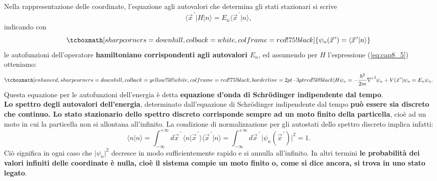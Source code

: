 Nella rappresentazione delle coordinate, l'equazione agli autovalori che determina gli stati stazionari si scrive
	\begin{equation}
		\langle {\vec{x}}^{\, \prime} \vert H \vert n \rangle = E_n\langle {\vec{x}}^{\, \prime} \vert n \rangle,
	\end{equation}
indicando con
	\begin{equation}
		\tcboxmath[sharp corners=downhill, colback=white, colframe=red!75!black]{
			\psi _n ({\vec{x}}^{\, \prime}) = \langle {\vec{x}}^{\, \prime} \vert n \rangle
			}
	\end{equation}
le autofunzioni dell'operatore \textbf{hamiltoniano corrispondenti agli autovalori $E_n$}, ed assumendo per $H$ l'espressione (\ref{eq:cap8_5}) otteniamo:
	\begin{equation}
		\tcboxmath[enhanced, sharp corners=downhill, colback=yellow!50!white, colframe=red!75!black, borderline={2pt}{-3pt}{red!50!black}]{
			H\psi _n = -\frac{\hbar ^ 2}{2m}{{\nabla '}^{\, 2}} \psi _n + V({\vec{x}}^{\, \prime})\psi _n = E_n \psi _n.
			}
	\end{equation}
Questa equazione per le autofunzioni dell'energia è detta \textbf{equazione d'onda di Schr\"{o}dinger indipendente dal tempo}.\\

\textbf{Lo spettro degli autovalori dell'energia}, determinato dall'equazione di Schr\"{o}dinger indipendente dal tempo \textbf{può essere sia discreto che continuo. Lo stato stazionario dello spettro discreto corrisponde sempre ad un moto finito della particella}, cioè ad un moto in cui la particella non si allontana all'infinito. La condizione di normalizzazione per gli autostati dello spettro discreto implica infatti:
	\begin{equation}
		\langle n \vert n \rangle = \int _{- \infty} ^{+\infty} d{\vec{x}}^{\, \prime}\,\langle n \vert {\vec{x}}^{\, \prime} \rangle \langle {\vec{x}}^{\, \prime} \vert n \rangle = \int _{- \infty} ^{+\infty} d{\vec{x}}^{\, \prime}\, \vert \psi _n ({\vec{x}}^{\, \prime}) \vert ^2 =1.
	\end{equation}
Ciò significa in ogni caso che $ \vert \psi _n  \vert ^2$ decresce in modo sufficientemente rapido e si annulla all'infinito. In altri termini \textbf{le probabilità dei valori infiniti delle coordinate è nulla, cioè il sistema compie un moto finito o, come si dice ancora, si trova in uno stato legato}.\\

